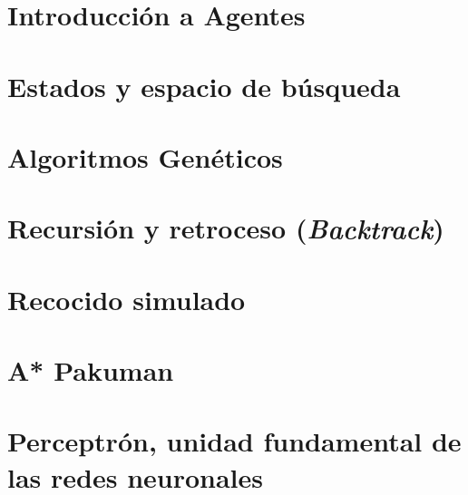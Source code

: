 \documentclass[12pt,openany]{book}
\begin{document}
\chapter{Introducción a Agentes}





\chapter{Estados y espacio de búsqueda}





\chapter{Algoritmos Genéticos}






\chapter[Retroceso]{Recursión y retroceso (\textit{Backtrack})}







\chapter{Recocido simulado}






\chapter{A* Pakuman}






\chapter[Perceptrón]{Perceptrón, unidad fundamental de las redes neuronales}
\end{document}

